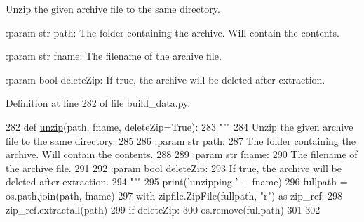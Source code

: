 \begin{DoxyVerb}Unzip the given archive file to the same directory.

:param str path:
    The folder containing the archive. Will contain the contents.

:param str fname:
    The filename of the archive file.

:param bool deleteZip:
    If true, the archive will be deleted after extraction.
\end{DoxyVerb}
 

Definition at line 282 of file build\+\_\+data.\+py.


\begin{DoxyCode}
282 \textcolor{keyword}{def }\hyperlink{namespaceparlai_1_1core_1_1build__data_a7cbfdf246ca40dc3ed9f8613deb14a00}{unzip}(path, fname, deleteZip=True):
283     \textcolor{stringliteral}{"""}
284 \textcolor{stringliteral}{    Unzip the given archive file to the same directory.}
285 \textcolor{stringliteral}{}
286 \textcolor{stringliteral}{    :param str path:}
287 \textcolor{stringliteral}{        The folder containing the archive. Will contain the contents.}
288 \textcolor{stringliteral}{}
289 \textcolor{stringliteral}{    :param str fname:}
290 \textcolor{stringliteral}{        The filename of the archive file.}
291 \textcolor{stringliteral}{}
292 \textcolor{stringliteral}{    :param bool deleteZip:}
293 \textcolor{stringliteral}{        If true, the archive will be deleted after extraction.}
294 \textcolor{stringliteral}{    """}
295     print(\textcolor{stringliteral}{'unzipping '} + fname)
296     fullpath = os.path.join(path, fname)
297     with zipfile.ZipFile(fullpath, \textcolor{stringliteral}{"r") as zip\_ref:}
298 \textcolor{stringliteral}{        zip\_ref.extractall(path)}
299 \textcolor{stringliteral}{    }\textcolor{keywordflow}{if} deleteZip:
300         os.remove(fullpath)
301 
302 
\end{DoxyCode}
